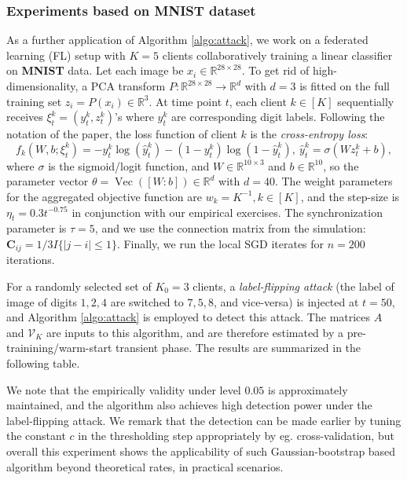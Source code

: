 \documentclass[a4paper,11pt]{article}
\numberwithin{equation}{section}
\theoremstyle{plain}
\theoremstyle{remark}
\begin{document}
\subsubsection{Experiments based on MNIST dataset}
 As a further application of Algorithm \ref{algo:attack}, we work on a federated learning (FL) setup with $K = 5$ clients collaboratively training a linear classifier on \textbf{{MNIST}} data. Let each image be $x_i \in \mathbb{R}^{28\times 28}$. To get rid of high-dimensionality, a PCA transform $P: \mathbb{R}^{28\times 28} \rightarrow \mathbb{R}^d$ with $d = 3$ is fitted on the full training set $z_i = P(x_i) \in \mathbb{R}^3$. At time point $t$, each client $k \in [K]$ sequentially receives $\xi_t^k=(y_t^k, z_t^k)$'s where $y_t^k$ are  corresponding digit labels. Following the notation of the paper, the loss function of client $k$ is the \textit{cross-entropy loss}:
\[f_k(W, b; \xi_t^k) = - y_t^k \log(\hat{y}_t^k) - (1 - y_t^k) \log(1 - \hat{y}_t^k), \ \hat{y}_t^k = \sigma(W z_t^k + b),\]
where $\sigma$ is the sigmoid/logit function, and $W \in \mathbb{R}^{10 \times 3}$ and $b \in \mathbb{R}^{10}$, so the parameter vector $\theta = \operatorname{Vec}( [W:b] ) \in \mathbb{R}^{d}$ with $d=40$. The weight parameters for the aggregated objective function are $w_k=K^{-1}, k \in [K]$, and the step-size is $\eta_t=0.3 t^{-0.75}$ in conjunction with our empirical exercises. The synchronization parameter is $\tau=5$, and we use the connection matrix from the simulation: $\mathbf{C}_{ij}=1/3 I\{|j-i|\leq 1\}$. Finally, we run the local SGD iterates for $n=200$ iterations. 

For a randomly selected set of $K_0=3$ clients, a \textit{label-flipping attack} (the label of image of digits $1, 2, 4$ are switched to $7,5,8$, and vice-versa) is injected at $t = 50$, and Algorithm \ref{algo:attack} is employed to detect this attack. The matrices $A$ and $\mathcal{V}_K$ are inputs to this algorithm, and are therefore estimated by a pre-trainining/warm-start transient phase. The results are summarized in the following table. 


\begin{table}[H]
\centering
{}
\caption{Simulation results for label-flipping attack detection.}
\end{table}


We note that the empirically validity under level $0.05$ is approximately maintained, and the algorithm also achieves high detection power under the label-flipping attack. We remark that the detection can be made earlier by tuning the constant $c$ in the thresholding step appropriately by eg. cross-validation, but overall this experiment shows the applicability of such Gaussian-bootstrap based algorithm beyond theoretical rates, in practical scenarios. 
\end{document}
